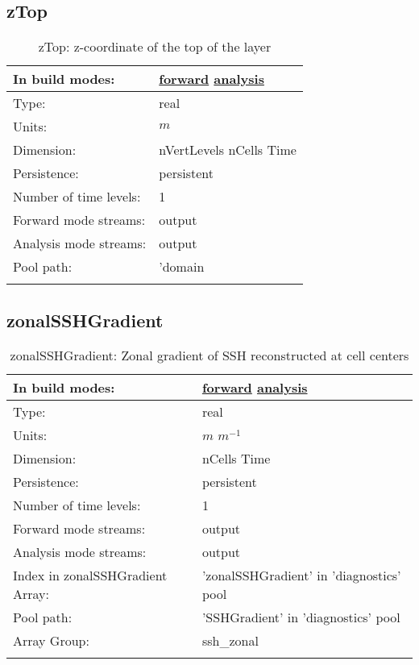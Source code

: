 \subsection[zTop]{zTop}
\label{subsec:var_sec_diagnostics_zTop}
\begin{center}
\begin{longtable}{| p{2.0in} | p{4.0in} |}
        \hline 
        In build modes: & \hyperref[subsec:forward_var_tab_diagnostics]{forward} \hyperref[subsec:analysis_var_tab_diagnostics]{analysis} \\
        \hline 
        Type: & real \\
        \hline 
        Units: & $m$ \\
        \hline 
        Dimension: & nVertLevels nCells Time \\
        \hline 
        Persistence: & persistent \\
        \hline 
        Number of time levels: & 1 \\
        \hline 
		 Forward mode streams: &  output \\
        \hline 
		 Analysis mode streams: &  output \\
        \hline 
            Pool path: & 'domain %
 \\
		 \hline 
    \caption{zTop: z-coordinate of the top of the layer}
\end{longtable}
\end{center}
\subsection[zonalSSHGradient]{zonalSSHGradient}
\label{subsec:var_sec_diagnostics_zonalSSHGradient}
\begin{center}
\begin{longtable}{| p{2.0in} | p{4.0in} |}
        \hline 
        In build modes: & \hyperref[subsec:forward_var_tab_diagnostics]{forward} \hyperref[subsec:analysis_var_tab_diagnostics]{analysis} \\
        \hline 
        Type: & real \\
        \hline 
        Units: & $m$ $m^{-1}$ \\
        \hline 
        Dimension: & nCells Time \\
        \hline 
        Persistence: & persistent \\
        \hline 
        Number of time levels: & 1 \\
        \hline 
		 Forward mode streams: &  output \\
        \hline 
		 Analysis mode streams: &  output \\
        \hline 
		 Index in zonalSSHGradient Array: & 'zonalSSHGradient' in 'diagnostics' pool \\
		 \hline 
            Pool path: & 'SSHGradient' in 'diagnostics' pool
 \\
		 \hline 
		 Array Group: & ssh\_zonal \\
		 \hline 
    \caption{zonalSSHGradient: Zonal gradient of SSH reconstructed at cell centers}
\end{longtable}
\end{center}
